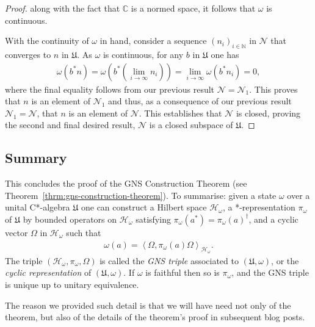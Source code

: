 \begin{proof}
\noindent along with the fact that $\mathbb{C}$ is a normed space, it follows that $\omega$ is continuous.

With the continuity of $\omega$ in hand, consider a sequence $(n_i)_{i \in \mathbb{N}}$ in $\mathcal{N}$ that converges to $n$ in $\mathfrak{U}$. As $\omega$ is continuous, for any $b$ in $\mathfrak{U}$ one has
\begin{align}
    \omega\left(b^*n\right) = \omega\left(b^*(\lim\limits_{i \rightarrow \infty} n_i)\right) = \lim\limits_{i \rightarrow \infty} \omega(b^*n_i) = 0,
\end{align}
where the final equality follows from our previous result $\mathcal{N} = \mathcal{N}_1$. This proves that $n$ is an element of $\mathcal{N}_1$ and thus, as a consequence of our previous result $\mathcal{N}_1 = \mathcal{N}$, that $n$ is an element of $\mathcal{N}$. This establishes that $\mathcal{N}$ is closed, proving the second and final desired result, $\mathcal{N}$ is a closed subspace of $\mathfrak{U}$.
\end{proof}

\subsection{Summary}
This concludes the proof of the GNS Construction Theorem (see Theorem~\ref{thrm:gns-construction-theorem}). To summarise: given a state $\omega$ over a unital C*-algebra $\mathfrak{U}$ one can construct a Hilbert space $\mathcal{H}_\omega$, a *-representation $\pi_\omega$ of $\mathfrak{U}$ by bounded operators on $\mathcal{H}_\omega$ satisfying $\pi_\omega(a^*) = \pi_\omega(a)^\dagger$, and a cyclic vector $\Omega$ in $\mathcal{H}_\omega$ such that
\begin{align}
    \omega(a) = \left<\Omega, \pi_\omega(a)\Omega\right>_{\mathcal{H}_\omega}.
\end{align}
The triple $(\mathcal{H}_\omega, \pi_\omega, \Omega)$ is called the \textit{GNS triple} associated to $(\mathfrak{U}, \omega)$, or the \textit{cyclic representation} of $(\mathfrak{U}, \omega)$. If $\omega$ is faithful then so is $\pi_\omega$, and the GNS triple is unique up to unitary equivalence.

\noindent The reason we provided such detail is that we will have need not only of the theorem, but also of the details of the theorem's proof in subsequent blog posts.
